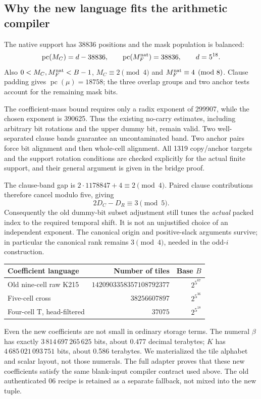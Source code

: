 \documentclass[11pt]{article}
\newcommand{\pc}{\operatorname{pc}}
\begin{document}
\subsection{Why the new language fits the arithmetic compiler}
The native support has 38836 positions and the mask population is balanced:
\[
\pc(M_C)=d-38836,\qquad \pc(M_F^{\rm nat})=38836,
\qquad d=5^{18}.
\]
Also $0<M_C,M_F^{\rm nat}<B-1$, $M_C\equiv2\pmod4$ and
$M_F^{\rm nat}\equiv4\pmod8$. Clause padding gives
$\pc(\mu)=18758$; the three overlap groups and two anchor tests account for the remaining mask bits.

The coefficient-mass bound requires only a radix exponent of 299907, while the chosen exponent is 390625. Thus the existing no-carry estimates, including arbitrary bit rotations and the upper dummy bit, remain valid. Two well-separated clause bands guarantee an uncontaminated band. Two anchor pairs force bit alignment and then whole-cell alignment. All 1319 copy/anchor targets and the support rotation conditions are checked explicitly for the actual finite support, and their general argument is given in the bridge proof.

The clause-band gap is $2\cdot1178847+4\equiv2\pmod4$. Paired clause contributions therefore cancel modulo five, giving
\[
2D_C-D_R\equiv3\pmod5.
\]
Consequently the old dummy-bit subset adjustment still tunes the \emph{actual} packed index to the required temporal shift. It is not an unjustified choice of an independent exponent. The canonical origin and positive-slack arguments survive; in particular the canonical rank remains $3\pmod4$, needed in the odd-$i$ construction.

\begin{center}\small
\begin{tabular}{lrr}
\toprule
Coefficient language&Number of tiles&Base $B$\\
\midrule
Old nine-cell raw K215&$1420903358357108792377$&$2^{5^{67}}$\\
Five-cell cross&$38256607897$&$2^{5^{36}}$\\
Four-cell T, head-filtered&$37075$&$2^{5^{18}}$\\
\bottomrule
\end{tabular}
\end{center}
Even the new coefficients are not small in ordinary storage terms. The numeral $\beta$ has exactly $3\,814\,697\,265\,625$ bits, about 0.477 decimal terabytes; $K$ has $4\,685\,021\,093\,751$ bits, about 0.586 terabytes. We materialized the tile alphabet and scalar layout, not those numerals. The full adapter proves that these new coefficients satisfy the same blank-input compiler contract used above. The old authenticated 06 recipe is retained as a separate fallback, not mixed into the new tuple.
\end{document}
